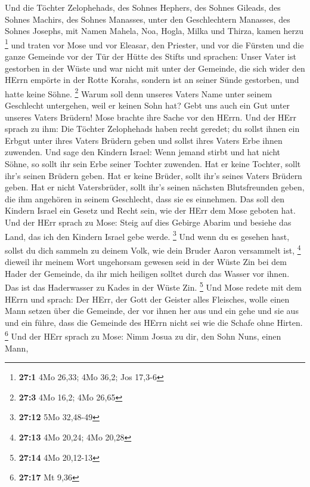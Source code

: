  Und die Töchter Zelophehads, des Sohnes Hephers, des Sohnes
Gileads, des Sohnes Machirs, des Sohnes Manasses, unter den
Geschlechtern Manasses, des Sohnes Josephs, mit Namen Mahela, Noa,
Hogla, Milka und Thirza, kamen herzu \footnote{\textbf{27:1} 4Mo 26,33;
  4Mo 36,2; Jos 17,3-6}  und traten vor Mose und vor
Eleasar, den Priester, und vor die Fürsten und die ganze Gemeinde vor
der Tür der Hütte des Stifts und sprachen:  Unser Vater ist
gestorben in der Wüste und war nicht mit unter der Gemeinde, die sich
wider den HErrn empörte in der Rotte Korahs, sondern ist an seiner Sünde
gestorben, und hatte keine Söhne. \footnote{\textbf{27:3} 4Mo 16,2; 4Mo
  26,65}  Warum soll denn unseres Vaters Name unter seinem
Geschlecht untergehen, weil er keinen Sohn hat? Gebt uns auch ein Gut
unter unseres Vaters Brüdern!  Mose brachte ihre Sache vor
den HErrn.  Und der HErr sprach zu ihm:  Die
Töchter Zelophehads haben recht geredet; du sollst ihnen ein Erbgut
unter ihres Vaters Brüdern geben und sollst ihres Vaters Erbe ihnen
zuwenden.  Und sage den Kindern Israel: Wenn jemand stirbt
und hat nicht Söhne, so sollt ihr sein Erbe seiner Tochter zuwenden.
 Hat er keine Tochter, sollt ihr's seinen Brüdern geben.
 Hat er keine Brüder, sollt ihr's seines Vaters Brüdern
geben.  Hat er nicht Vatersbrüder, sollt ihr's seinen
nächsten Blutsfreunden geben, die ihm angehören in seinem Geschlecht,
dass sie es einnehmen. Das soll den Kindern Israel ein Gesetz und Recht
sein, wie der HErr dem Mose geboten hat.  Und der HErr
sprach zu Mose: Steig auf dies Gebirge Abarim und besiehe das Land, das
ich den Kindern Israel gebe werde. \footnote{\textbf{27:12} 5Mo 32,48-49}
 Und wenn du es gesehen hast, sollst du dich sammeln zu
deinem Volk, wie dein Bruder Aaron versammelt ist, \footnote{\textbf{27:13}
  4Mo 20,24; 4Mo 20,28}  dieweil ihr meinem Wort ungehorsam
gewesen seid in der Wüste Zin bei dem Hader der Gemeinde, da ihr mich
heiligen solltet durch das Wasser vor ihnen. Das ist das Haderwasser zu
Kades in der Wüste Zin. \footnote{\textbf{27:14} 4Mo 20,12-13}
 Und Mose redete mit dem HErrn und sprach: 
Der HErr, der Gott der Geister alles Fleisches, wolle einen Mann setzen
über die Gemeinde,  der vor ihnen her aus und ein gehe und
sie aus und ein führe, dass die Gemeinde des HErrn nicht sei wie die
Schafe ohne Hirten. \footnote{\textbf{27:17} Mt 9,36}  Und
der HErr sprach zu Mose: Nimm Josua zu dir, den Sohn Nuns, einen Mann,
